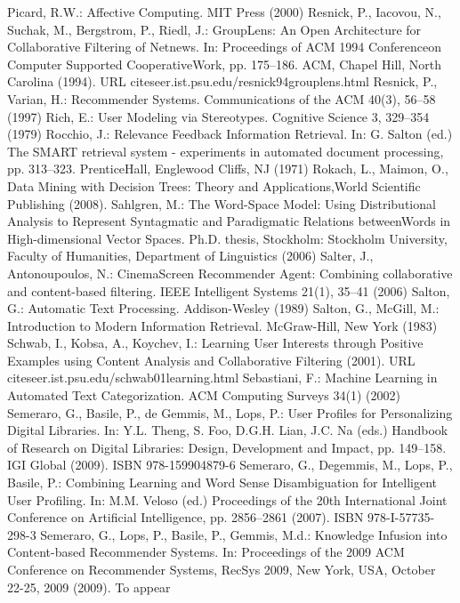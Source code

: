 \begin{thebibliography}{99}
Picard, R.W.: Affective Computing. MIT Press (2000)
Resnick, P., Iacovou, N., Suchak, M., Bergstrom, P., Riedl, J.: GroupLens: An Open Architecture for Collaborative Filtering of Netnews. In: Proceedings of ACM 1994 Conferenceon Computer Supported CooperativeWork, pp. 175–186. ACM, Chapel Hill, North Carolina (1994). URL citeseer.ist.psu.edu/resnick94grouplens.html
Resnick, P., Varian, H.: Recommender Systems. Communications of the ACM 40(3), 56–58 (1997)
Rich, E.: User Modeling via Stereotypes. Cognitive Science 3, 329–354 (1979)
Rocchio, J.: Relevance Feedback Information Retrieval. In: G. Salton (ed.) The SMART retrieval system - experiments in automated document processing, pp. 313–323. PrenticeHall, Englewood Cliffs, NJ (1971)
Rokach, L., Maimon, O., Data Mining with Decision Trees: Theory and Applications,World Scientific Publishing (2008).
Sahlgren, M.: The Word-Space Model: Using Distributional Analysis to Represent Syntagmatic and Paradigmatic Relations betweenWords in High-dimensional Vector Spaces. Ph.D. thesis, Stockholm: Stockholm University, Faculty of Humanities, Department of Linguistics (2006)
Salter, J., Antonoupoulos, N.: CinemaScreen Recommender Agent: Combining collaborative and content-based filtering. IEEE Intelligent Systems 21(1), 35–41 (2006)
Salton, G.: Automatic Text Processing. Addison-Wesley (1989)
Salton, G., McGill, M.: Introduction to Modern Information Retrieval. McGraw-Hill, New York (1983)
Schwab, I., Kobsa, A., Koychev, I.: Learning User Interests through Positive Examples using Content Analysis and Collaborative Filtering (2001). URL citeseer.ist.psu.edu/schwab01learning.html
Sebastiani, F.: Machine Learning in Automated Text Categorization. ACM Computing Surveys 34(1) (2002)
Semeraro, G., Basile, P., de Gemmis, M., Lops, P.: User Profiles for Personalizing Digital Libraries. In: Y.L. Theng, S. Foo, D.G.H. Lian, J.C. Na (eds.) Handbook of Research on Digital Libraries: Design, Development and Impact, pp. 149–158. IGI Global (2009). ISBN 978-159904879-6
Semeraro, G., Degemmis, M., Lops, P., Basile, P.: Combining Learning and Word Sense Disambiguation for Intelligent User Profiling. In: M.M. Veloso (ed.) Proceedings of the 20th International Joint Conference on Artificial Intelligence, pp. 2856–2861 (2007). ISBN 978-I-57735-298-3
Semeraro, G., Lops, P., Basile, P., Gemmis, M.d.: Knowledge Infusion into Content-based Recommender Systems. In: Proceedings of the 2009 ACM Conference on Recommender Systems, RecSys 2009, New York, USA, October 22-25, 2009 (2009). To appear

\end{thebibliography}
